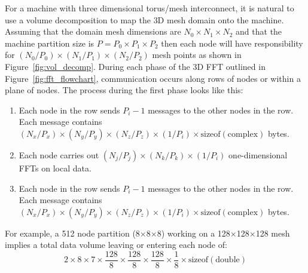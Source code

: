 \documentclass[pdftex,finalversion,simpleeqnnos,titlepage,12pt]{article}
\newcommand{\nodecount}{\ensuremath{P}}
\newcommand{\meshsize}[1]{\ensuremath{N_{#1}}}
\newcommand{\nodemeshsize}[1]{\ensuremath{\nodecount_{#1}}}
\begin{document}
For a machine with three dimensional torus/mesh interconnect, it is
natural to use a volume decomposition to map the 3D mesh domain onto
the machine.  Assuming that the domain mesh dimensions are
$\meshsize{0}\times \meshsize{1}\times \meshsize{2}$ and that the
machine partition size is $\nodecount=\nodemeshsize{0}\times
\nodemeshsize{1}\times \nodemeshsize{2}$ then each node will have
responsibility for $(\meshsize{0}/\nodemeshsize{0})\times
(\meshsize{1}/\nodemeshsize{1})\times (\meshsize{2}/\nodemeshsize{2})$
mesh points as shown in Figure~\ref{fig:vol_decomp}. During each phase
of the 3D FFT outlined in Figure~\ref{fig:fft_flowchart},
communication occurs along rows of nodes or within a plane of nodes.
The process during the first phase looks like this:
\begin{enumerate}
\item Each node in the row sends $\nodemeshsize{i}-1$ messages to the
  other nodes in the row.  Each message contains
  $(\meshsize{x}/\nodemeshsize{x})\times
  (\meshsize{y}/\nodemeshsize{y})\times
  (\meshsize{z}/\nodemeshsize{z})\times (1/\nodemeshsize{i})\times
  \mbox{sizeof}(\mbox{complex})$ bytes.
\item Each node carries out $(\meshsize{j}/\nodemeshsize{j})\times
  (\meshsize{k}/\nodemeshsize{k})\times (1/\nodemeshsize{i})$
  one-dimensional FFTs on local data.
\item Each node in the row sends $\nodemeshsize{i}-1$ messages to the
  other nodes in the row.  Each message contains
  $(\meshsize{x}/\nodemeshsize{x})\times
  (\meshsize{y}/\nodemeshsize{y})\times
  (\meshsize{z}/\nodemeshsize{z})\times (1/\nodemeshsize{i})\times
  \mbox{sizeof}(\mbox{complex})$ bytes.
\end{enumerate}

For example, a 512 node partition (8$\times$8$\times$8) working on a
128$\times$128$\times$128 mesh implies a total data volume leaving or
entering each node of:
\begin{displaymath}
2\times 8\times 7\times \frac{128}{8}\times \frac{128}{8}\times
\frac{128}{8}\times \frac{1}{8}\times \mbox{sizeof}(\mbox{double})
\end{displaymath}

\end{document}
